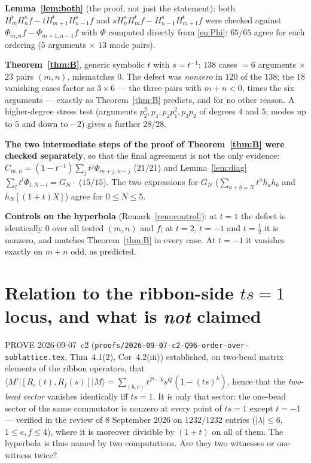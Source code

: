 \documentclass[11pt]{article}
\theoremstyle{definition}
\newcommand{\Hop}{H}
\begin{document}
\medskip\noindent\textbf{Lemma~\ref{lem:both}} (the proof, not just the statement): both
$\Hop^t_m\Hop^s_nf-t\Hop^t_{m+1}\Hop^s_{n-1}f$ and
$s\Hop^s_n\Hop^t_mf-\Hop^s_{n-1}\Hop^t_{m+1}f$ were checked against
$\Phi_{m,n}f-\Phi_{m+1,n-1}f$ with $\Phi$ computed directly from \eqref{eq:Phi}:
$65/65$ agree for each ordering ($5$ arguments $\times$ $13$ mode pairs).

\medskip\noindent\textbf{Theorem~\ref{thm:B}}, generic symbolic $t$ with $s=t^{-1}$:
$138$ cases $=6$ arguments $\times$ $23$ pairs $(m,n)$, mismatches $0$. The defect was
\emph{nonzero} in $120$ of the $138$; the $18$ vanishing cases factor as $3\times 6$ --- the
three pairs with $m+n<0$, times the six arguments --- exactly as Theorem~\ref{thm:B} predicts,
and for no other reason. A higher-degree stress test (arguments $p_2^2,p_4,p_2p_1^2,p_3p_2$
of degrees $4$ and $5$; modes up to $5$ and down to $-2$) gives a further $28/28$.

\medskip\noindent\textbf{The two intermediate steps of the proof of Theorem~\ref{thm:B}
were checked separately}, so that the final agreement is not the only evidence:
$C_{m,n}=(1-t^{-1})\sum_jt^j\Phi_{m+j,n-j}$ ($21/21$) and Lemma~\ref{lem:diag}
$\sum_lt^l\Phi_{l,N-l}=G_N\cdot$ ($15/15$). The two expressions for $G_N$
($\sum_{a+b=N}t^ah_ah_b$ and $h_N[(1+t)X]$) agree for $0\le N\le5$.

\medskip\noindent\textbf{Controls on the hyperbola} (Remark~\ref{rem:control}): at $t=1$ the
defect is identically $0$ over all tested $(m,n)$ and $f$; at $t=2$, $t=-1$ and $t=\frac12$ it
is nonzero, and matches Theorem~\ref{thm:B} in every case. At $t=-1$ it vanishes exactly on
$m+n$ odd, as predicted.

\section{Relation to the ribbon-side $ts=1$ locus, and what is \emph{not} claimed}

PROVE 2026-09-07~c2 (\texttt{proofs/2026-09-07-c2-Q96-order-over-sublattice.tex},
Thm~4.1(2), Cor~4.2(iii)) established, on two-bead matrix elements of the ribbon
operators, that
$\langle M'|[R_e(t),R_f(s)]|M\rangle=\sum_{(b,c)}t^{P-k}s^{Q}(1-(ts)^k)$, hence that the
\emph{two-bead sector} vanishes identically iff $ts=1$. It is only that sector: the one-bead
sector of the same commutator is nonzero at every point of $ts=1$ except $t=-1$ --- verified
in the review of 8 September 2026 on $1232/1232$ entries ($|\lambda|\le6$, $1\le e,f\le4$),
where it is moreover divisible by $(1+t)$ on all of them. The hyperbola is thus named by two
computations. Are they two witnesses or one witness twice?
\end{document}
